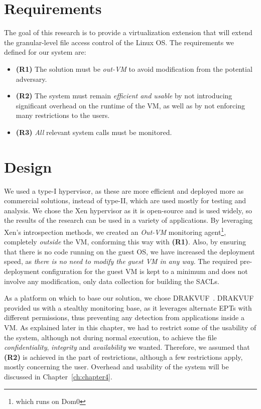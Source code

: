 \section{Requirements}\label{sec:requirements}
The goal of this research is to provide a virtualization extension that will extend the granular-level file access control of the Linux \ac{OS}. The requirements we defined for our system are:
\begin{itemize}
	\item \textbf{(R1)} The solution must be \emph{out-\ac{VM}} to avoid modification from the potential adversary. 
	\item \textbf{(R2)} The system must remain \emph{efficient and usable} by not introducing significant overhead on the runtime of the \ac{VM}, as well as by not enforcing many restrictions to the users. 
	\item \textbf{(R3)} \emph{All} relevant system calls must be monitored.
\end{itemize}


\section{Design}\label{sec:design}

\par We used a type-I hypervisor, as these are more efficient and deployed more as commercial solutions, instead of type-II, which are used mostly for testing and analysis. We chose the Xen hypervisor as it is open-source and is used widely, so the results of the research can be used in a variety of applications. By leveraging Xen's introspection methods, we created an \emph{Out-VM} monitoring agent\footnote{which runs on Dom0}, completely \emph{outside} the \ac{VM}, conforming this way with \textbf{(R1)}. Also, by ensuring that there is no code running on the guest \ac{OS}, we have increased the deployment speed, as \emph{there is no need to modify the guest \ac{VM} in any way}. The required pre-deployment configuration for the guest \ac{VM} is kept to a minimum and does not involve any modification, only data collection for building the \acp{SACL}.

\par As a platform on which to base our solution, we chose DRAKVUF~\cite{lengyel2014drakvuf}. DRAKVUF provided us with a stealthy monitoring base, as it leverages alternate \ac{EPT}s with different permissions, thus preventing any detection from applications inside a \ac{VM}. As explained later in this chapter, we had to restrict some of the usability of the system, although not during normal execution, to achieve the file \emph{confidentiality}, \emph{integrity} and \emph{availability} we wanted. Therefore, we assumed that \textbf{(R2)} is achieved in the part of restrictions, although a few restrictions apply, mostly concerning the  user. Overhead and usability of the system will be discussed in Chapter~\ref{ch:chapter4}.

